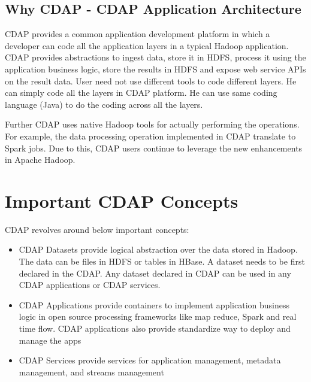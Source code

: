 \documentclass[9pt,twocolumn,twoside]{styles/osajnl}
\begin{document}
\subsection{Why CDAP - CDAP Application Architecture}
CDAP provides a common application development platform in which a developer
can code all the application layers in a typical Hadoop application. CDAP
provides abstractions to ingest data, store it in HDFS, process it using
the application business logic, store the results in HDFS and expose web
service APIs on the result data. User need not use different tools to code
different layers. He can simply code all the layers in CDAP platform. He can
use same coding language (Java) to do the coding across all the layers.

Further CDAP uses native Hadoop tools for actually performing the operations.
 For example, the data processing operation implemented in CDAP translate to
 Spark jobs. Due to this, CDAP users continue to leverage the new
 enhancements in Apache Hadoop.


\section{Important CDAP Concepts}
CDAP revolves around below important concepts:
\begin{itemize}
\item CDAP Datasets provide logical abstraction over the data stored in
Hadoop. The data can be files in HDFS or tables in HBase. A dataset needs to
be first declared in the CDAP. Any dataset declared in CDAP can be used in
any CDAP applications or CDAP services.
\item CDAP Applications provide containers to implement application business
logic in open source processing frameworks like map reduce, Spark and real
time flow. CDAP applications also provide standardize way to deploy and
manage the apps
\item CDAP Services provide services for application management, metadata
management, and streams management
\end{itemize}
\end{document}
